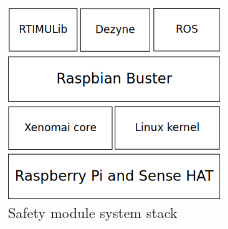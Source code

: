 \documentclass[12pt]{scrreprt}
\begin{document}
\begin{figure}[H]
    \centering
    \includegraphics[width=0.5\textwidth]{Figures/results/os_environment_stack.png}
    \caption{Safety module system stack}
    \label{fig:stack}
\end{figure}
\end{document}
